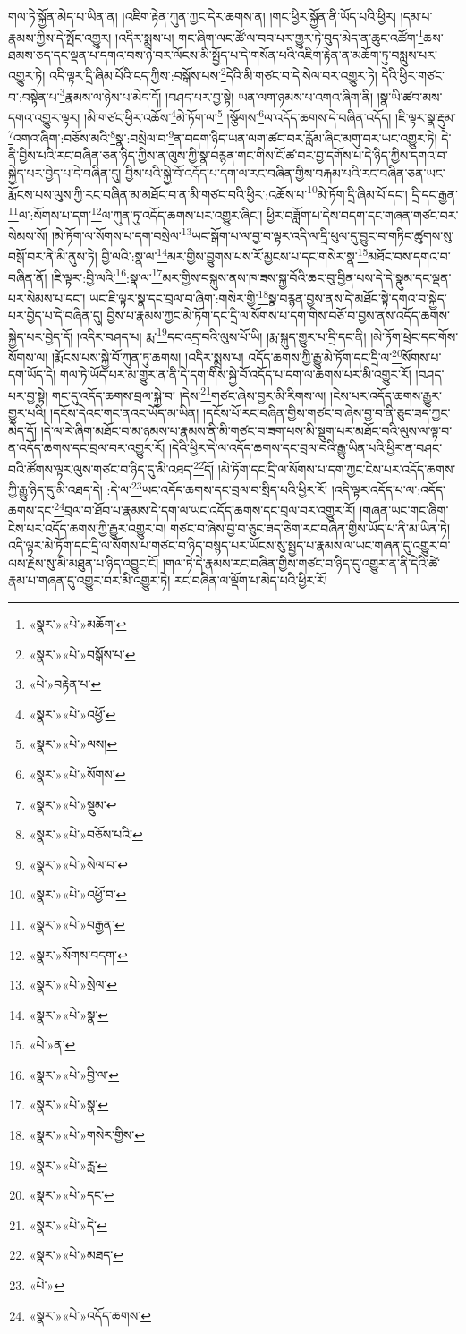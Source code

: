 གལ་ཏེ་སྐྱོན་མེད་པ་ཡིན་ན། །འཇིག་རྟེན་ཀུན་ཀྱང་དེར་ཆགས་ན། །གང་ཕྱིར་སྐྱོན་ནི་ཡོད་པའི་ཕྱིར། །དམ་པ་རྣམས་ཀྱིས་དེ་སྤོང་འགྱུར། །འདིར་སྨྲས་པ། གང་ཞིག་ལང་ཚོ་ལ་བབ་པར་གྱུར་ཏེ་བུད་མེད་ན་ཆུང་འཚོག་\footnote{«སྣར་»«པེ་»མཆོག་}ཆས་ཐམས་ཅད་དང་ལྡན་པ་དགའ་བས་ཉེ་བར་ལོངས་མི་སྤྱོད་པ་དེ་གསོན་པའི་འཇིག་རྟེན་ན་མཆོག་ཏུ་བསླུས་པར་འགྱུར་ཏེ། འདི་ལྟར་དྲི་ཞིམ་པོའི་ངད་ཀྱིས་:བསྒོས་པས་\footnote{«སྣར་»«པེ་»བསྒོས་པ་}དེའི་མི་གཙང་བ་དེ་སེལ་བར་འགྱུར་ཏེ། དེའི་ཕྱིར་གཙང་བ་:བསྟེན་པ་\footnote{«པེ་»བརྟེན་པ་}རྣམས་ལ་ཉེས་པ་མེད་དོ། །བཤད་པར་བྱ་སྟེ། ཡན་ལག་ཉམས་པ་འགའ་ཞིག་ནི། །སྣ་ཡི་ཚབ་མས་དགའ་འགྱུར་ལྟར། །མི་གཙང་ཕྱིར་འཆོས་\footnote{«སྣར་»«པེ་»འཕྱོ་}མེ་ཏོག་ལ།\footnote{«སྣར་»«པེ་»ལས།} །སྩོགས་\footnote{«སྣར་»«པེ་»སོགས་}ལ་འདོད་ཆགས་དེ་བཞིན་འདོད། །ཇི་ལྟར་སྣ་རྡུམ་\footnote{«སྣར་»«པེ་»སྡུམ་}འགའ་ཞིག་:བཅོས་མའི་\footnote{«སྣར་»«པེ་»བཅོས་པའི་}སྣ་:བསྲེལ་བ་\footnote{«སྣར་»«པེ་»སེལ་བ་}ན་བདག་ཉིད་ཡན་ལག་ཚང་བར་རློམ་ཞིང་མགུ་བར་ཡང་འགྱུར་ཏེ། དེ་ནི་བྱིས་པའི་རང་བཞིན་ཅན་ཉིད་ཀྱིས་ན་ལུས་ཀྱི་སྣ་བརྙན་གང་གིས་ངོ་ཚ་བར་བྱ་དགོས་པ་དེ་ཉིད་ཀྱིས་དགའ་བ་སྐྱེད་པར་བྱེད་པ་དེ་བཞིན་དུ། བྱིས་པའི་སྐྱེ་བོ་འདོད་པ་དག་ལ་རང་བཞིན་གྱིས་བརྐམ་པའི་རང་བཞིན་ཅན་ཡང་རྨོངས་པས་ལུས་ཀྱི་རང་བཞིན་མ་མཐོང་བ་ན་མི་གཙང་བའི་ཕྱིར་:འཆོས་པ་\footnote{«སྣར་»«པེ་»འཕྱོ་བ་}མེ་ཏོག་དྲི་ཞིམ་པོ་དང་། དྲི་དང་རྒྱན་\footnote{«སྣར་»«པེ་»བརྒྱན་}ལ་:སོགས་པ་དག་\footnote{«སྣར་»སོགས་བདག་}ལ་ཀུན་ཏུ་འདོད་ཆགས་པར་འགྱུར་ཞིང་། ཕྱིར་བཟློག་པ་དེས་བདག་དང་གཞན་གཙང་བར་སེམས་སོ། །མེ་ཏོག་ལ་སོགས་པ་དག་བསྲེལ་\footnote{«སྣར་»«པེ་»སྲེལ་}ཡང་སྒོག་པ་ལ་བྱ་བ་ལྟར་འདི་ལ་དྲི་ཕུལ་དུ་བྱུང་བ་གཏིང་ཚུགས་སུ་བསྒོ་བར་ནི་མི་ནུས་ཏེ། བྱི་ལའི་:སྣ་ལ་\footnote{«སྣར་»«པེ་»སྣ་}མར་གྱིས་བྱུགས་པས་རོ་མྱངས་པ་དང་གསེར་སྣ་\footnote{«པེ་»ན་}མཐོང་བས་དགའ་བ་བཞིན་ནོ། །ཇི་ལྟར་:བྱི་ལའི་\footnote{«སྣར་»«པེ་»བྱི་ལ་}:སྣ་ལ་\footnote{«སྣར་»«པེ་»སྣ་}མར་གྱིས་བསྐུས་ནས་ཁ་ཟས་སྐྱ་བོའི་ཆང་བུ་བྱིན་པས་དེ་དེ་སྣུམ་དང་ལྡན་པར་སེམས་པ་དང་། ཡང་ཇི་ལྟར་སྣ་དང་བྲལ་བ་ཞིག་:གསེར་གྱི་\footnote{«སྣར་»«པེ་»གསེར་གྱིས་}སྣ་བརྙན་བྱས་ནས་དེ་མཐོང་སྟེ་དགའ་བ་སྐྱེད་པར་བྱེད་པ་དེ་བཞིན་དུ། བྱིས་པ་རྣམས་ཀྱང་མེ་ཏོག་དང་དྲི་ལ་སོགས་པ་དག་གིས་བཅོ་བ་བྱས་ནས་འདོད་ཆགས་སྐྱེད་པར་བྱེད་དོ། །འདིར་བཤད་པ། རྨ་\footnote{«སྣར་»«པེ་»རླ་}དང་འདྲ་བའི་ལུས་པོ་ཡི། །རྨ་སྐུད་གྱུར་པ་དྲི་དང་ནི། །མེ་ཏོག་ཕྲེང་དང་གོས་སོགས་ལ། །རྨོངས་པས་སྐྱེ་བོ་ཀུན་ཏུ་ཆགས། །འདིར་སྨྲས་པ། འདོད་ཆགས་ཀྱི་རྒྱུ་མེ་ཏོག་དང་དྲི་ལ་\footnote{«སྣར་»«པེ་»དང་}སོགས་པ་དག་ཡོད་དེ། གལ་ཏེ་ཡོད་པར་མ་གྱུར་ན་ནི་དེ་དག་གིས་སྐྱེ་བོ་འདོད་པ་དག་ལ་ཆགས་པར་མི་འགྱུར་རོ། །བཤད་པར་བྱ་སྟེ། གང་དུ་འདོད་ཆགས་བྲལ་སྐྱེ་བ། །དེས་\footnote{«སྣར་»«པེ་»དེ་}གཙང་ཞེས་བྱར་མི་རིགས་ལ། །ངེས་པར་འདོད་ཆགས་རྒྱུར་གྱུར་པའི། །དངོས་དེའང་གང་ནའང་ཡོད་མ་ཡིན། །དངོས་པོ་རང་བཞིན་གྱིས་གཙང་བ་ཞེས་བྱ་བ་ནི་ཅུང་ཟད་ཀྱང་མེད་དོ། །དེ་ལ་རེ་ཞིག་མཐོང་བ་མ་ཉམས་པ་རྣམས་ནི་མི་གཙང་བ་ཟག་པས་མི་སྡུག་པར་མཐོང་བའི་ལུས་ལ་ལྟ་བ་ན་འདོད་ཆགས་དང་བྲལ་བར་འགྱུར་རོ། །དེའི་ཕྱིར་དེ་ལ་འདོད་ཆགས་དང་བྲལ་བའི་རྒྱུ་ཡིན་པའི་ཕྱིར་ན་བཤང་བའི་ཚོགས་ལྟར་ལུས་གཙང་བ་ཉིད་དུ་མི་འཐད་\footnote{«སྣར་»«པེ་»མཐད་}དོ། །མེ་ཏོག་དང་དྲི་ལ་སོགས་པ་དག་ཀྱང་ངེས་པར་འདོད་ཆགས་ཀྱི་རྒྱུ་ཉིད་དུ་མི་འཐད་དེ། :དེ་ལ་\footnote{«པེ་»}ཡང་འདོད་ཆགས་དང་བྲལ་བ་སྲིད་པའི་ཕྱིར་རོ། །འདི་ལྟར་འདོད་པ་ལ་:འདོད་ཆགས་དང་\footnote{«སྣར་»«པེ་»འདོད་ཆགས་}བྲལ་བ་ཐོབ་པ་རྣམས་དེ་དག་ལ་ཡང་འདོད་ཆགས་དང་བྲལ་བར་འགྱུར་རོ། །གཞན་ཡང་གང་ཞིག་ངེས་པར་འདོད་ཆགས་ཀྱི་རྒྱུར་འགྱུར་བ། གཙང་བ་ཞེས་བྱ་བ་ཅུང་ཟད་ཅིག་རང་བཞིན་གྱིས་ཡོད་པ་ནི་མ་ཡིན་ཏེ། འདི་ལྟར་མེ་ཏོག་དང་དྲི་ལ་སོགས་པ་གཙང་བ་ཉིད་བསྙད་པར་ཡོངས་སུ་སྤྱད་པ་རྣམས་ལ་ཡང་གཞན་དུ་འགྱུར་བ་ལས་རྗེས་སུ་མི་མཐུན་པ་ཉིད་འབྱུང་ངོ། །གལ་ཏེ་དེ་རྣམས་རང་བཞིན་གྱིས་གཙང་བ་ཉིད་དུ་འགྱུར་ན་ནི་དེའི་ཚེ་རྣམ་པ་གཞན་དུ་འགྱུར་བར་མི་འགྱུར་ཏེ། རང་བཞིན་ལ་ལྡོག་པ་མེད་པའི་ཕྱིར་རོ། 